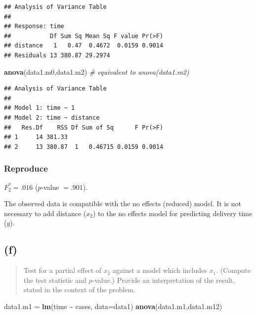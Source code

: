 \documentclass[
]{article}
\newenvironment{Shaded}{\begin{snugshade}}{\end{snugshade}}
\newcommand{\AttributeTok}[1]{\textcolor[rgb]{0.13,0.29,0.53}{#1}}
\newcommand{\CommentTok}[1]{\textcolor[rgb]{0.56,0.35,0.01}{\textit{#1}}}
\newcommand{\FunctionTok}[1]{\textcolor[rgb]{0.13,0.29,0.53}{\textbf{#1}}}
\newcommand{\NormalTok}[1]{#1}
\newcommand{\OtherTok}[1]{\textcolor[rgb]{0.56,0.35,0.01}{#1}}
\newcommand{\SpecialCharTok}[1]{\textcolor[rgb]{0.81,0.36,0.00}{\textbf{#1}}}
\begin{document}
\begin{verbatim}
## Analysis of Variance Table
## 
## Response: time
##           Df Sum Sq Mean Sq F value Pr(>F)
## distance   1   0.47  0.4672  0.0159 0.9014
## Residuals 13 380.87 29.2974
\end{verbatim}

\begin{Shaded}
\begin{Highlighting}[]
\FunctionTok{anova}\NormalTok{(data1.m0,data1.m2)  }\CommentTok{\# equivalent to anova(data1.m2)}
\end{Highlighting}
\end{Shaded}

\begin{verbatim}
## Analysis of Variance Table
## 
## Model 1: time ~ 1
## Model 2: time ~ distance
##   Res.Df    RSS Df Sum of Sq      F Pr(>F)
## 1     14 381.33                           
## 2     13 380.87  1   0.46715 0.0159 0.9014
\end{verbatim}

\hypertarget{reproduce-4}{%
\subsubsection{Reproduce}\label{reproduce-4}}

\(F_2^* = .016\) (\(p\)-value \(= .901\)).

The observed data is compatible with the no effects (reduced) model. It
is not necessary to add distance (\(x_2\)) to the no effects model for
predicting delivery time (\(y\)).

\hypertarget{f}{%
\subsection{(f)}\label{f}}

\begin{quote}
Test for a partial effect of \(x_2\) against a model which includes
\(x_1\). (Compute the test statistic and \(p\)-value.) Provide an
interpretation of the result, stated in the context of the problem.
\end{quote}

\begin{Shaded}
\begin{Highlighting}[]
\NormalTok{data1.m1 }\OtherTok{=} \FunctionTok{lm}\NormalTok{(time }\SpecialCharTok{\textasciitilde{}}\NormalTok{ cases, }\AttributeTok{data=}\NormalTok{data1)}
\FunctionTok{anova}\NormalTok{(data1.m1,data1.m12)}
\end{Highlighting}
\end{Shaded}
\end{document}
